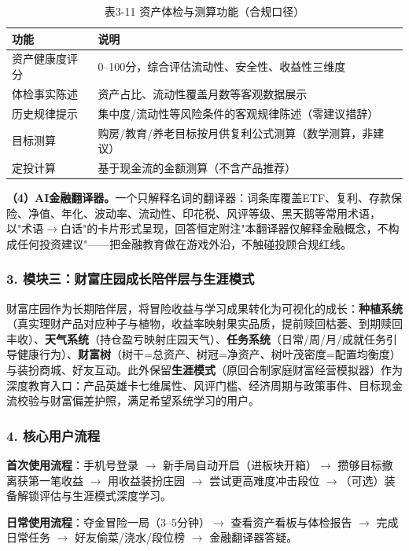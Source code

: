 \documentclass[12pt,a4paper]{ctexart}
\begin{document}
\begin{table}[htbp]
\centering
\begin{tabular}{p{3.4cm}p{9.2cm}}
\toprule
\textbf{功能} & \textbf{说明} \\
\midrule
资产健康度评分 & 0--100分，综合评估流动性、安全性、收益性三维度 \\
体检事实陈述 & 资产占比、流动性覆盖月数等客观数据展示 \\
历史规律提示 & 集中度/流动性等风险条件的客观规律陈述（零建议措辞） \\
目标测算 & 购房/教育/养老目标按月供复利公式测算（数学测算，非建议） \\
定投计算 & 基于现金流的金额测算（不含产品推荐） \\
\bottomrule
\end{tabular}
\caption*{表3-11 \quad 资产体检与测算功能（合规口径）}
\end{table}

\textbf{（4）AI金融翻译器。}一个只解释名词的翻译器：词条库覆盖ETF、复利、存款保险、净值、年化、波动率、流动性、印花税、风评等级、黑天鹅等常用术语，以"术语$\rightarrow$白话"的卡片形式呈现，回答恒定附注"本翻译器仅解释金融概念，不构成任何投资建议"——把金融教育做在游戏外沿，不触碰投顾合规红线。

\subsubsection{3. 模块三：财富庄园成长陪伴层与生涯模式}
财富庄园作为长期陪伴层，将冒险收益与学习成果转化为可视化的成长：\textbf{种植系统}（真实理财产品对应种子与植物，收益率映射果实品质，提前赎回枯萎、到期赎回丰收）、\textbf{天气系统}（持仓盈亏映射庄园天气）、\textbf{任务系统}（日常/周/月/成就任务引导健康行为）、\textbf{财富树}（树干=总资产、树冠=净资产、树叶茂密度=配置均衡度）与装扮商城、好友互动。此外保留\textbf{生涯模式}（原回合制家庭财富经营模拟器）作为深度教育入口：产品英雄卡七维属性、风评门槛、经济周期与政策事件、目标现金流校验与财富偏差护照，满足希望系统学习的用户。

\subsubsection{4. 核心用户流程}
\textbf{首次使用流程}：手机号登录 $\rightarrow$ 新手局自动开启（进板块开箱）$\rightarrow$ 攒够目标撤离获第一笔收益 $\rightarrow$ 用收益装扮庄园 $\rightarrow$ 尝试更高难度冲击段位 $\rightarrow$（可选）装备解锁评估与生涯模式深度学习。

\textbf{日常使用流程}：夺金冒险一局（3--5分钟）$\rightarrow$ 查看资产看板与体检报告 $\rightarrow$ 完成日常任务 $\rightarrow$ 好友偷菜/浇水/段位榜 $\rightarrow$ 金融翻译器答疑。
\end{document}
